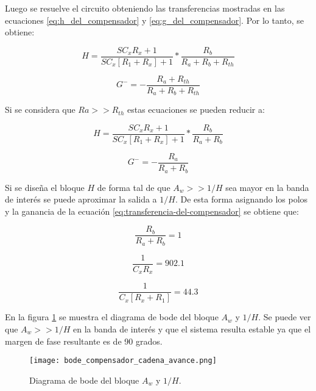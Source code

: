 Luego se resuelve el circuito obteniendo las transferencias mostradas en las ecuaciones \ref{eq:h_del_compensador} y \ref{eq:g_del_compensador}. Por lo tanto, se obtiene:

\begin{equation} 
	H = \frac{SC_xR_x+1}{SC_x[R_1+R_x]+1} * \frac{R_b}{R_a + R_b + R_{th}}
\end{equation}

\begin{equation} 
	G^- = - \frac{R_a + R_{th}}{R_a + R_b + R_{th}}
\end{equation}

Si se considera que $Ra>>R_{th}$ estas ecuaciones se pueden reducir a: 

\begin{equation} 
	H = \frac{SC_xR_x+1}{SC_x[R_1+R_x]+1} * \frac{R_b}{R_a + R_b}
\end{equation}

\begin{equation} 
	G^- =- \frac{R_a}{R_a + R_b}
\end{equation} 
  
Si se diseña el bloque $H$ de forma tal de que $A_w>>1/H$ sea mayor en la banda de interés se puede aproximar la salida a $1/H$. De esta forma  asignando los polos y la ganancia de la ecuación \ref{eq:transferencia-del-compensador} se obtiene que:

\begin{equation} 
	\frac{R_b}{R_a+R_b}= 1 
\end{equation}

\begin{equation} 
	\frac{1}{C_x R_x} =  902.1
\end{equation} 

\begin{equation} 
	\frac{1}{C_x [R_x + R_1]} = 44.3
\end{equation} 

En la figura \ref{fig:bode_compensador_cadena_avance} se muestra el diagrama de bode del bloque $A_w$ y $1/H$. Se puede ver que $A_w >> 1/H$ en la banda de interés y que el sistema resulta estable ya que el margen de fase resultante es de 90 grados.
 
\begin{figure}[H]
	\centering
	\texttt{[image: bode\_compensador\_cadena\_avance.png]}
	\caption{Diagrama de bode del bloque $A_w$ y $1/H$.}
	\label{fig:bode_compensador_cadena_avance}
\end{figure}

